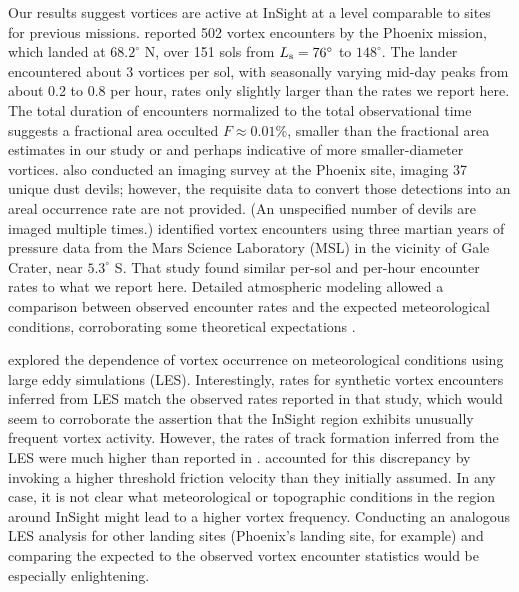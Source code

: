 \documentclass[linenumbers,trackchanges]{aastex63}
\begin{document}
Our results suggest vortices are active at InSight at a level comparable to sites for previous missions. \citet{2010JGRE..115.0E16E} reported 502 vortex encounters by the Phoenix mission, which landed at $68.2^\circ$ N, over 151 sols from $L_{\rm s} = 76^\circ$ to $148^\circ$. The lander encountered about 3 vortices per sol, with seasonally varying mid-day peaks from about 0.2 to 0.8 per hour, rates only slightly larger than the rates we report here. The total duration of encounters normalized to the total observational time suggests a fractional area occulted $F \approx 0.01\%$, smaller than the fractional area estimates in our study or \citet{2021Icar..35514119L} and perhaps indicative of more smaller-diameter vortices. \citet{2010JGRE..115.0E16E} also conducted an imaging survey at the Phoenix site, imaging 37 unique dust devils; however, the requisite data to convert those detections into an areal occurrence rate are not provided. (An unspecified number of devils are imaged multiple times.) \citet{2019JGRE..124.3442N} identified vortex encounters using three martian years of pressure data from the Mars Science Laboratory (MSL) in the vicinity of Gale Crater, near $5.3^\circ$ S. That study found similar per-sol and per-hour encounter rates to what we report here. Detailed atmospheric modeling allowed a comparison between observed encounter rates and the expected meteorological conditions, corroborating some theoretical expectations \citep{1998JAtS...55.3244R}.

\citet{2021JGRE..12606511S} explored the dependence of vortex occurrence on meteorological conditions using large eddy simulations (LES). Interestingly, rates for synthetic vortex encounters inferred from LES match the observed rates reported in that study, which would seem to corroborate the assertion that the InSight region exhibits unusually frequent vortex activity. However, the rates of track formation inferred from the LES were much higher than reported in \citet{2020GeoRL..4787234P}. \citet{2021JGRE..12606511S} accounted for this discrepancy by invoking a higher threshold friction velocity than they initially assumed. In any case, it is not clear what meteorological or topographic conditions in the region around InSight might lead to a higher vortex frequency. Conducting an analogous LES analysis for other landing sites (Phoenix's landing site, for example) and comparing the expected to the observed vortex encounter statistics would be especially enlightening. 

\end{document}
